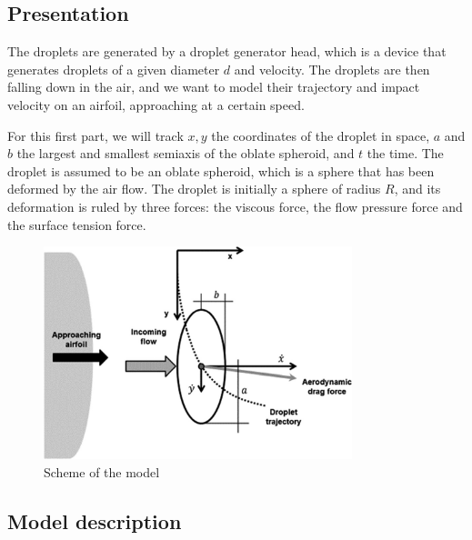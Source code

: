 \documentclass[10pt]{report}
\begin{document}
\subsection*{Presentation}
\par The droplets are generated by a droplet generator head, which is a device that generates droplets of a given diameter $d$ and velocity. The droplets are then falling down in the air, and we want to model their trajectory and impact velocity on an airfoil, approaching at a certain speed.
\par For this first part, we will track $x,y$ the coordinates of the droplet in space, $a$ and $b$ the largest and smallest semiaxis of the oblate spheroid, and $t$ the time. The droplet is assumed to be an oblate spheroid, which is a sphere that has been deformed by the air flow. The droplet is initially a sphere of radius $R$, and its deformation is ruled by three forces: the viscous force, the flow pressure force and the surface tension force.
\begin{figure}[H]
    \centering
    \includegraphics[width=0.8\textwidth]{figures/scheme_model.png}
    \caption{Scheme of the model}
\end{figure}

\subsection*{Model description}
\end{document}
